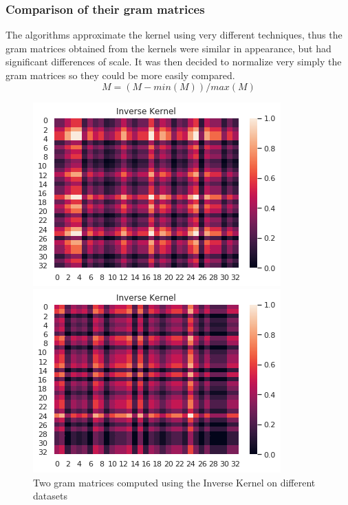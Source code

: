 \documentclass{article}
\theoremstyle{definition}
\begin{document}
\subsubsection{Comparison of their gram matrices}
The algorithms approximate the kernel using very different techniques, thus the gram matrices obtained from the kernels were similar in appearance, but had significant differences of scale. It was then decided to normalize very simply the gram matrices so they could be more easily compared.
\begin{equation}
	M = (M - min(M) )/max(M)
\end{equation}
\begin{figure}[!htb]
	\begin{multicols}{2}
		\includegraphics[width=\linewidth]{data/gram/gram.png}\par
		\includegraphics[width=\linewidth]{data/gram/gram2.png}\par
	\end{multicols}
	\caption{Two gram matrices computed using the Inverse Kernel on different datasets}
\end{figure}
\end{document}
